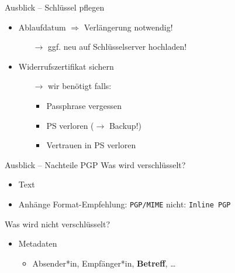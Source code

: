 \documentclass{beamer}
\begin{document}
\begin{frame}{Ausblick – Schlüssel pflegen}
  \begin{itemize}
  \item Ablaufdatum $\Rightarrow$ Verlängerung notwendig!
  \begin{itemize}
    \item[$\rightarrow$] ggf. neu auf Schlüsselserver hochladen!
  \end{itemize}

  \pause
  \vspace*{\baselineskip}

  \item Widerrufszertifikat sichern
  \begin{itemize}
    \item[$\rightarrow$] wir benötigt falls:
    \begin{itemize}
      \item Passphrase vergessen
      \item PS verloren ($\rightarrow$ Backup!)
      \item Vertrauen in PS verloren
    \end{itemize}
  \end{itemize}
  \end{itemize}
\end{frame}


\begin{frame}{Ausblick – Nachteile PGP}
Was wird verschlüsselt?
\begin{itemize}
\item Text
\item Anhänge {\tiny Format-Empfehlung: \texttt{PGP/MIME} \quad nicht: \texttt{Inline PGP}}
\item[]
\end{itemize}
Was wird nicht verschlüsselt?
\begin{itemize}
 \item Metadaten
 \begin{itemize}
  \item Absender*in, Empfänger*in, \textbf{Betreff}, …
  \item[]
 \end{itemize}
\end{itemize}
\end{frame}

\end{document}
